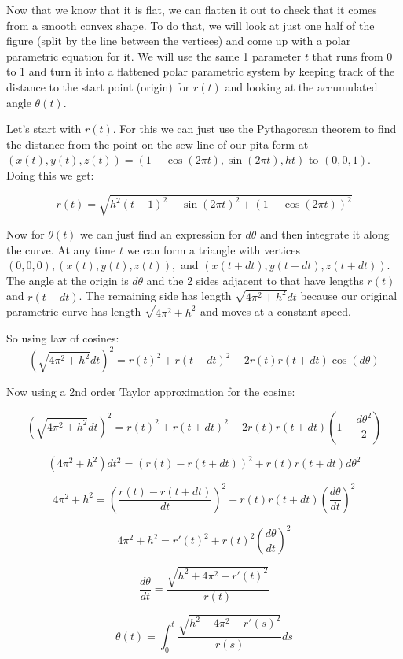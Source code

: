 \documentclass[12pt]{article}
\begin{document}
Now that we know that it is flat, we can flatten it out to check that it comes from a smooth convex shape. To do that, we will look at just one half of the figure (split by the line between the vertices) and come up with a polar parametric equation for it. We will use the same 1 parameter $t$ that runs from 0 to 1 and turn it into a flattened polar parametric system by keeping track of the distance to the start point (origin) for $r(t)$ and looking at the accumulated angle $\theta (t)$. 

Let's start with $r(t)$. For this we can just use the Pythagorean theorem to find the distance from the point on the sew line of our pita form at  $(x(t), y(t), z(t)) = \left(1-\cos(2\pi t), \sin(2\pi t), ht \right)$ to $(0,0,1)$. Doing this we get:

$$ r(t) = \sqrt{h^2(t-1)^2+ \sin (2\pi t)^2+ (1-\cos(2\pi t))^2}$$

Now for $\theta(t)$ we can just find an expression for $d\theta$ and then integrate it along the curve. At any time $t$ we can form a triangle with vertices $(0, 0, 0), (x(t), y(t), z(t)),$ and $(x(t+dt), y(t+dt), z(t+dt))$. The angle at the origin is $d\theta$ and the 2 sides adjacent to that have lengths $r(t)$ and $r(t+dt)$. The remaining side has length $\sqrt{4 \pi^2 +h^2}dt$ because our original parametric curve has length $\sqrt{4 \pi^2 +h^2}$ and moves at a constant speed.

So using law of cosines:
$$\left(\sqrt{4 \pi^2 +h^2}dt\right)^2 = r(t)^2 + r(t+dt)^2 - 2r(t)r(t+dt)\cos ( d\theta)$$

Now using a 2nd order Taylor approximation for the cosine:

$$\left(\sqrt{4 \pi^2 +h^2}dt\right)^2 = r(t)^2 + r(t+dt)^2 - 2r(t)r(t+dt)\left(1- \frac{d\theta^2}{2}\right)$$

$$(4 \pi^2 +h^2)dt^2 = (r(t) - r(t+dt))^2 +r(t)r(t+dt)d\theta^2$$


$$4 \pi^2 +h^2= \left(\frac{r(t) - r(t+dt)}{dt}\right)^2 +r(t)r(t+dt)\left(\frac{d\theta}{dt}\right)^2$$

$$4 \pi^2 +h^2= r'(t)^2 +r(t)^2\left(\frac{d\theta}{dt}\right)^2$$

$$\frac{d\theta}{dt} = \frac{\sqrt{h^2 + 4 \pi^2 - r'(t)^2}}{r(t)} $$

$$\theta(t) = \int_0^t \frac{\sqrt{h^2 + 4 \pi^2 - r'(s)^2}}{r(s)} ds$$
\end{document}
